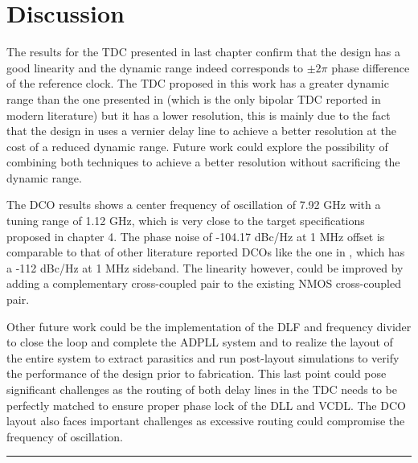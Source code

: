 \chapter{Discussion}

The results for the TDC presented in last chapter confirm that the design has a good linearity and the dynamic range indeed corresponds to $\pm 2 \pi$ phase difference of the reference clock.
The TDC proposed in this work has a greater dynamic range than the one presented in \cite{MohammadAmin2022} (which is the only bipolar TDC reported in modern literature) but it has a lower resolution, 
this is mainly due to the fact that the design in \cite{MohammadAmin2022} uses a vernier delay line to achieve a better resolution at the cost of a reduced dynamic range. Future work could explore
the possibility of combining both techniques to achieve a better resolution without sacrificing the dynamic range.

The DCO results shows a center frequency of oscillation of 7.92 GHz with a tuning range of 1.12 GHz, which is very close to the target specifications proposed in chapter 4. The
phase noise of -104.17 dBc/Hz at 1 MHz offset is comparable to that of other literature reported DCOs like the one in \cite{DCO_Chen2023}, which has a -112 dBc/Hz at 1 MHz sideband.
The linearity however, could be improved by adding a complementary cross-coupled pair to the existing NMOS cross-coupled pair.

Other future work could be the implementation of the DLF and frequency divider to close the loop and complete the ADPLL system and to realize the layout of the entire system 
to extract parasitics and run post-layout simulations to verify the performance of the design prior to fabrication. This last point could pose significant challenges as the
routing of both delay lines in the TDC needs to be perfectly matched to ensure proper phase lock of the DLL and VCDL. The DCO layout also faces important challenges as excessive
routing could compromise the frequency of oscillation.

\noindent\rule{\textwidth}{1pt}